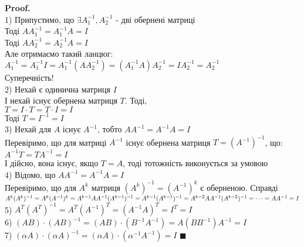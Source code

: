 \documentclass[a4paper, 10pt]{article}
\def\proof{\textbf{Proof.}\\}
\def\qed{$\blacksquare$}
\theoremstyle{theoremdd}
\theoremstyle{theoremdd}
\theoremstyle{theoremdd}
\theoremstyle{theoremdd}
\theoremstyle{theoremdd}
\theoremstyle{theoremdd}
\theoremstyle{theoremdd}
\theoremstyle{theoremdd}
\begin{document}
	\proof
	1) Припустимо, що $\exists A^{-1}_1, A^{-1}_2$ - дві обернені матриці\\
	Тоді $AA^{-1}_1 = A_1^{-1}A = I$\\
	Тоді $AA^{-1}_2 = A_2^{-1}A = I$\\
	Але отримаємо такий ланцюг:\\
	$A^{-1}_1 = A^{-1}_1 I = A^{-1}_1 (A A^{-1}_2) = (A^{-1}_1 A) A^{-1}_2 = I A_2^{-1} = A_2^{-1}$\\
	Суперечність!
	\bigskip \\
	2) Нехай є одинична матриця $I$\\
	І нехай існує обернена матриця $T$. Тоді,\\
	$T = I \cdot T = T \cdot I = I$\\
	Тоді $T = I^{-1} = I$
	\bigskip \\
	3) Нехай для $A$ існує $A^{-1}$, тобто $AA^{-1} = A^{-1}A = I$\\
	Перевіримо, що для матриці $A^{-1}$ існує обернена матриця $T = (A^{-1})^{-1}$, що:\\
	$A^{-1} T = T A^{-1} = I$\\
	І дійсно, вона існує, якщо $T = A$, тоді тотожність виконується за умовою
	\bigskip \\
	4) Відомо, що $AA^{-1} = A^{-1}A = I$\\
	Перевіримо, що для $A^{k}$ матриця $(A^{k})^{-1} = (A^{-1})^k$ є оберненою. Справді\\
	$A^{k} (A^{k})^{-1} = A^{k} (A^{-1})^{k} = A^{k-1} A A^{-1} (A^{k-1})^{-1} = A^{k-1} (A^{k-1})^{-1} = A^{k-2} A A^{-1} (A^{k-2})^{-1} \\ = \dots = AA^{-1} = I$
	\bigskip \\
	5) $A^{T} (A^{T})^{-1} = A^{T} (A^{-1})^T = (A^{-1} A)^{T} = I^T = I$
	\bigskip \\
	6) $(AB) \cdot (AB)^{-1} = (AB) \cdot (B^{-1} A^{-1}) = A(B B^{-1})A^{-1} = I$
	\bigskip \\
	7) $(\alpha A) \cdot (\alpha A)^{-1} = (\alpha A) \cdot (\alpha^{-1} A^{-1}) = I$ \qed
	\bigskip \\
	
\end{document}
